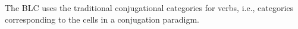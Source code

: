  The BLC uses the traditional conjugational categories for verbs, i.e., categories corresponding to the cells in a conjugation paradigm.

